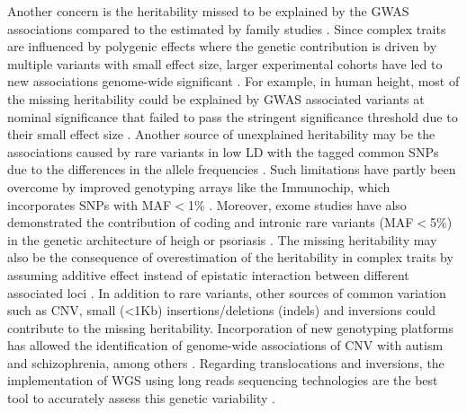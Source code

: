 Another concern is the heritability missed to be explained by the GWAS associations compared to the estimated by family studies \parencite{Ku2010, Yang2010}. Since complex traits are influenced by polygenic effects where the genetic contribution is driven by multiple variants with small effect size, larger experimental cohorts have led to new associations genome-wide significant \parencite{Visscher2017}. For example, in human height, most of the missing heritability could be explained by GWAS associated variants at nominal significance that failed to pass the stringent significance threshold due to their small effect size \parencite{Yang2010}. Another source of unexplained heritability may be the associations caused by rare variants in low LD with the tagged common SNPs due to the differences in the allele frequencies \parencite{Wray2005}. Such limitations have partly been overcome by improved genotyping arrays like the Immunochip, which incorporates SNPs with MAF${<}$1\% \parencite{Cortes2011}. Moreover, exome studies have also demonstrated the contribution of coding and intronic rare variants (MAF${<}$5\%) in the genetic architecture of heigh or psoriasis \parencite{ Marouli2017, Dand2017}. The missing heritability may also be the consequence of overestimation of the heritability in complex traits by assuming additive effect instead of epistatic interaction between different associated loci \parencite{Zuk2012}. In addition to rare variants, other sources of common variation such as CNV, small (<1Kb) insertions/deletions (indels) and inversions could contribute to the missing heritability. Incorporation of new genotyping platforms has allowed the identification of genome-wide associations of CNV with autism and schizophrenia, among others \parencite{Glessner2009,Marshall2017}. Regarding translocations and inversions, the implementation of WGS using long reads sequencing technologies are the best tool to accurately assess this genetic variability \parencite{Visscher2017}.


